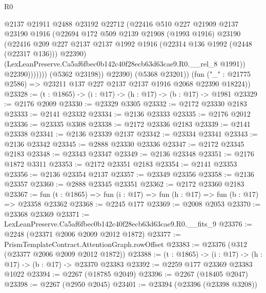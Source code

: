 \begin{lexlean}{R0}
\begin{coremodule}
                        @2137
                        @21911
                        @2488
                        @23192
                        @22712
                        (@22416
                          @510
                          @227
                          @21909
                          @2137
                          @23190
                          @1916
                          (@22694
                            @172
                            @509
                            @2139
                            @21908
                            (@1993 @1916)
                            @23190
                            (@22416
                              @209
                              @227
                              @2137
                              @2137
                              @1992
                              @1916
                              (@22314 @136 @1992 (@2448 (@22317 @136)))
                              @22390)
                            (LexLeanPreserve.Ca5af6fbec0b142c40f28ecb63d63cae9.R0.__rel_8 @1991))
                          @22390)))))))
            (@5362 @23198))
          @22390)
        (@5368 @23201))
      (fun ("_" : @21775 @2586) => @23211 @137 @227 @2137 @2137 @1916 @2068 @22390 @18224))
@23328 := (t : @1865) -> (i : @17) -> (h : @17) -> (b : @17) -> @1981
@23329 := @2176 @2009
@23330 := @23329 @3305
@23332 := @2172 @23330 @2183
@23333 := @2141 @23332
@23334 := @2136 @23333
@23335 := @2176 @2012
@23336 := @23335 @3308
@23338 := @2172 @23336 @2183
@23339 := @2141 @23338
@23341 := @2136 @23339 @2137
@23342 := @23334 @23341
@23343 := @2136 @23342
@23345 := @2888 @23330 @23336
@23347 := @2172 @23345 @2183
@23348 := @23343 @23347
@23349 := @2136 @23348
@23351 := @2176 @1872 @3311
@23353 := @2172 @23351 @2183
@23354 := @2141 @23353
@23356 := @2136 @23354 @2137
@23357 := @23349 @23356
@23358 := @2136 @23357
@23360 := @2888 @23345 @23351
@23362 := @2172 @23360 @2183
@23367 := fun (t : @1865) => fun (i : @17) => fun (h : @17) => fun (b : @17) => @23358 @23362
@23368 := @2245 @177
@23369 := @2008 @2053
@23370 := @23368 @23369
@23371 := LexLeanPreserve.Ca5af6fbec0b142c40f28ecb63d63cae9.R0.__fits_9
@23376 := @2248 (@23371 @2006 @2009 @2012 @1872)
@23377 := PrismTemplateContract.AttentionGraph.rowOffset
@23383 := @23376 (@312 (@23377 @2006 @2009 @2012 @1872))
@23388 := (t : @1865) -> (i : @17) -> (h : @17) -> (b : @17) -> @23370 @23383
@23392 := @2259 @177 @23369 @23383 @1022
@23394 := @2267 (@18785 @2049)
@23396 := @2267 (@18405 @2047)
@23398 := @2267 (@2950 @2045)
@23401 := @23394 (@23396 (@23398 @3208))

\end{coremodule}
\end{lexlean}
